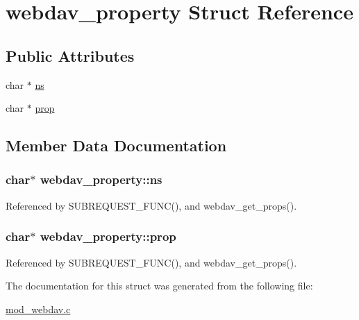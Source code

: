 \hypertarget{structwebdav__property}{\section{webdav\-\_\-property Struct Reference}
\label{structwebdav__property}
}
\subsection*{Public Attributes}
\begin{DoxyCompactItemize}
\item 
char $\ast$ \hyperlink{structwebdav__property_acef0ea9ce033eff1ccba9240e01a8388}{ns}
\item 
char $\ast$ \hyperlink{structwebdav__property_a8ff4bddc5eb52b28dbb769525944743b}{prop}
\end{DoxyCompactItemize}


\subsection{Member Data Documentation}
\hypertarget{structwebdav__property_acef0ea9ce033eff1ccba9240e01a8388}{
\subsubsection[{ns}]{\setlength{\rightskip}{0pt plus 5cm}char$\ast$ webdav\-\_\-property\-::ns}}\label{structwebdav__property_acef0ea9ce033eff1ccba9240e01a8388}


Referenced by S\-U\-B\-R\-E\-Q\-U\-E\-S\-T\-\_\-\-F\-U\-N\-C(), and webdav\-\_\-get\-\_\-props().

\hypertarget{structwebdav__property_a8ff4bddc5eb52b28dbb769525944743b}{
\subsubsection[{prop}]{\setlength{\rightskip}{0pt plus 5cm}char$\ast$ webdav\-\_\-property\-::prop}}\label{structwebdav__property_a8ff4bddc5eb52b28dbb769525944743b}


Referenced by S\-U\-B\-R\-E\-Q\-U\-E\-S\-T\-\_\-\-F\-U\-N\-C(), and webdav\-\_\-get\-\_\-props().



The documentation for this struct was generated from the following file\-:\begin{DoxyCompactItemize}
\item 
\hyperlink{mod__webdav_8c}{mod\-\_\-webdav.\-c}\end{DoxyCompactItemize}
